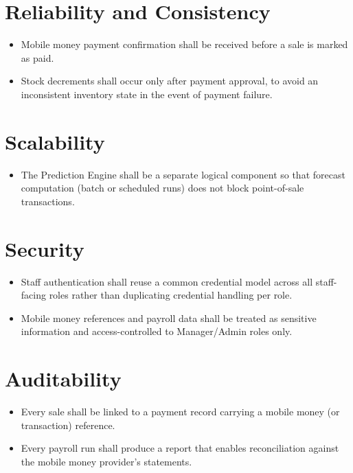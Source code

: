 \documentclass[11pt,a4paper]{report}
\begin{document}
\section{Reliability and Consistency}
\begin{itemize}[itemsep=2pt]
    \item[NFR-1] Mobile money payment confirmation shall be received before a sale is marked as paid.
    \item[NFR-2] Stock decrements shall occur only after payment approval, to avoid an inconsistent inventory state in the event of payment failure.
\end{itemize}

\section{Scalability}
\begin{itemize}[itemsep=2pt]
    \item[NFR-3] The Prediction Engine shall be a separate logical component so that forecast computation (batch or scheduled runs) does not block point-of-sale transactions.
\end{itemize}

\section{Security}
\begin{itemize}[itemsep=2pt]
    \item[NFR-4] Staff authentication shall reuse a common credential model across all staff-facing roles rather than duplicating credential handling per role.
    \item[NFR-5] Mobile money references and payroll data shall be treated as sensitive information and access-controlled to Manager/Admin roles only.
\end{itemize}

\section{Auditability}
\begin{itemize}[itemsep=2pt]
    \item[NFR-6] Every sale shall be linked to a payment record carrying a mobile money (or transaction) reference.
    \item[NFR-7] Every payroll run shall produce a report that enables reconciliation against the mobile money provider's statements.
\end{itemize}
\end{document}
